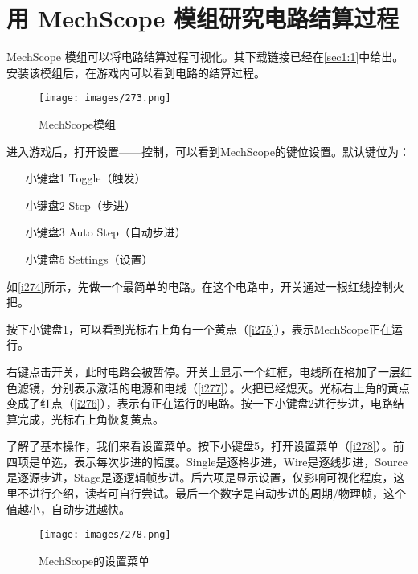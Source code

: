 \section{用 MechScope 模组研究电路结算过程}
MechScope 模组可以将电路结算过程可视化。其下载链接已经在\autoref{sec1:1}中给出。安装该模组后，在游戏内可以看到电路的结算过程。

\begin{figure}[!ht]
\texttt{[image: images/273.png]}
\caption{MechScope模组}\label{i273}
\end{figure}

进入游戏后，打开设置——控制，可以看到MechScope的键位设置。默认键位为：
\begin{itemize}
\item[小键盘1] Toggle（触发）
\item[小键盘2] Step（步进）
\item[小键盘3] Auto Step（自动步进）
\item[小键盘5] Settings（设置）
\end{itemize}

如\autoref{i274}所示，先做一个最简单的电路。在这个电路中，开关通过一根红线控制火把。
\begin{figure}[!ht]
\begin{center}
\qquad
{}
\end{center}
\caption{}
\end{figure}

按下小键盘1，可以看到光标右上角有一个黄点（\autoref{i275}），表示MechScope正在运行。
\begin{figure}[!ht]
\begin{center}
\qquad
{}
\end{center}
\caption{}
\end{figure}

右键点击开关，此时电路会被暂停。开关上显示一个红框，电线所在格加了一层红色滤镜，分别表示激活的电源和电线（\autoref{i277}）。火把已经熄灭。光标右上角的黄点变成了红点（\autoref{i276}），表示有正在运行的电路。按一下小键盘2进行步进，电路结算完成，光标右上角恢复黄点。

了解了基本操作，我们来看设置菜单。按下小键盘5，打开设置菜单（\autoref{i278}）。前四项是单选，表示每次步进的幅度。Single是逐格步进，Wire是逐线步进，Source是逐源步进，Stage是逐逻辑帧步进。后六项是显示设置，仅影响可视化程度，这里不进行介绍，读者可自行尝试。最后一个数字是自动步进的周期/物理帧，这个值越小，自动步进越快。
\begin{figure}
\centering
\texttt{[image: images/278.png]}
\caption{MechScope的设置菜单}\label{i278}
\end{figure}

